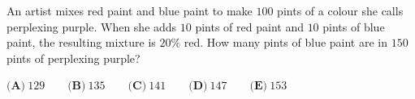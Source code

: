 An artist mixes red paint and blue paint to make $100$ pints of a colour she calls perplexing purple. When she adds $10$ pints of red paint and $10$ pints of blue paint, the resulting mixture is $20\%$ red. How many pints of blue paint are in $150$ pints of perplexing purple?

$\textbf{(A)}\ 129\qquad\textbf{(B)}\ 135\qquad\textbf{(C)}\ 141\qquad\textbf{(D)}\ 147\qquad\textbf{(E)}\ 153$
